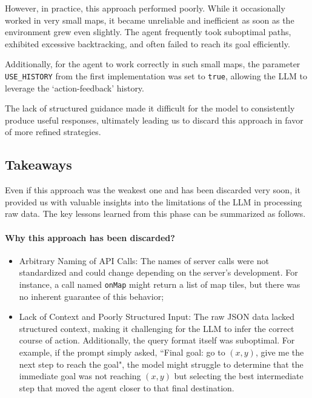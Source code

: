 However, in practice, this approach performed poorly. While it occasionally worked
in very small maps, it became unreliable and inefficient as soon as the
environment grew even slightly. The agent frequently took suboptimal paths,
exhibited excessive backtracking, and often failed to reach its goal efficiently.

Additionally, for the agent to work correctly in such small maps, the parameter \texttt{USE\_HISTORY}
from the first implementation was set to \texttt{true}, allowing the LLM to
leverage the `action-feedback' history.

The lack of structured guidance made it difficult for the model to consistently
produce useful responses, ultimately leading us to discard this approach in favor
of more refined strategies.

\subsection{Takeaways}

Even if this approach was the weakest one and has been discarded very soon, it provided
us with valuable insights into the limitations of the LLM in processing raw data.
The key lessons learned from this phase can be summarized as follows.

\paragraph{Why this approach has been discarded?}
\begin{itemize}
  \item Arbitrary Naming of API Calls: The names of server calls were not
    standardized and could change depending on the server's development. For instance,
    a call named \texttt{onMap} might return a list of map tiles, but there was
    no inherent guarantee of this behavior;

  \item Lack of Context and Poorly Structured Input: The raw JSON data lacked
    structured context, making it challenging for the LLM to infer the correct course
    of action. Additionally, the query format itself was suboptimal. For example,
    if the prompt simply asked, ``Final goal: go to $(x,y)$, give me the next
    step to reach the goal", the model might struggle to determine that the
    immediate goal was not reaching $(x, y)$ but selecting the best intermediate
    step that moved the agent closer to that final destination.
\end{itemize}

